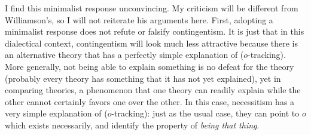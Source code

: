 I find this minimalist response unconvincing. My criticism will be different from Williamson's, so I will not reiterate his arguments here.
First, adopting a minimalist response does not refute or falsify contingentism. It is just that in this dialectical context, contingentism will look much less attractive because there is an alternative theory that has a perfectly simple explanation of ($o$-tracking). More generally, not being able to explain something is no defeat for the theory (probably every theory has something that it has not yet explained), yet in comparing theories, a phenomenon that one theory can readily explain while the other cannot certainly favors one over the other. In this case, necessitism has a very simple explanation of ($o$-tracking): just as the usual case, they can point to $o$ which exists necessarily, and identify the property of \emph{being that thing}. 

